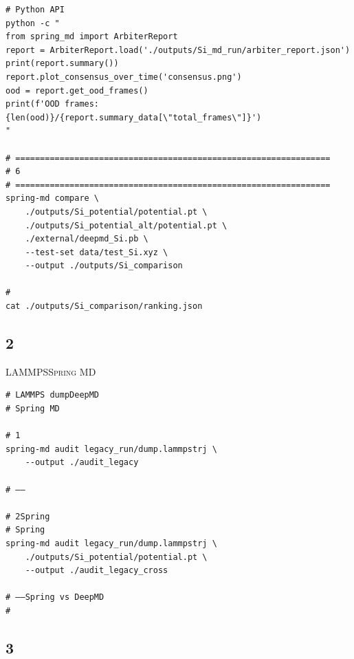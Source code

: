 \documentclass[12pt,a4paper]{article}
\theoremstyle{remark}
\newcommand{\SpringMD}{\textsc{Spring MD}}
\begin{document}
\begin{lstlisting}[caption={},label=lst:workflow]
# Python API
python -c "
from spring_md import ArbiterReport
report = ArbiterReport.load('./outputs/Si_md_run/arbiter_report.json')
print(report.summary())
report.plot_consensus_over_time('consensus.png')
ood = report.get_ood_frames()
print(f'OOD frames: {len(ood)}/{report.summary_data[\"total_frames\"]}')
"

# ================================================================
# 6
# ================================================================
spring-md compare \
    ./outputs/Si_potential/potential.pt \
    ./outputs/Si_potential_alt/potential.pt \
    ./external/deepmd_Si.pb \
    --test-set data/test_Si.xyz \
    --output ./outputs/Si_comparison

# 
cat ./outputs/Si_comparison/ranking.json
\end{lstlisting}

\subsection{2}

LAMMPS\SpringMD{}

\begin{lstlisting}[caption={},label=lst:third_party]
# LAMMPS dumpDeepMD
# Spring MD

# 1
spring-md audit legacy_run/dump.lammpstrj \
    --output ./audit_legacy

# ——

# 2Spring
# Spring
spring-md audit legacy_run/dump.lammpstrj \
    ./outputs/Si_potential/potential.pt \
    --output ./audit_legacy_cross

# ——Spring vs DeepMD
# 
\end{lstlisting}

\subsection{3}
\end{document}
